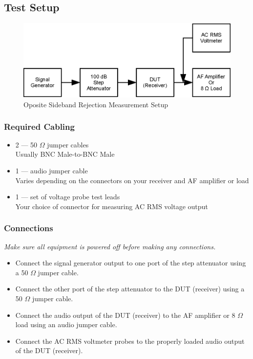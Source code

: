 \documentclass[10pt,letterpaper]{book}
\begin{document}
\subsection*{Test Setup}
\begin{figure}
\centering
\includegraphics[scale=1]{Illustrations/MDSSetup}
\caption{Oposite Sideband Rejection Measurement Setup}
\end{figure}
\subsubsection*{Required Cabling}
\begin{itemize}
	\item 2 --- 50 $\Omega$ jumper cables \\
		Usually BNC Male-to-BNC Male
	\item 1 --- audio jumper cable \\
		Varies depending on the connectors on your receiver and AF amplifier or load
	\item 1 --- set of voltage probe test leads \\
		Your choice of connector for measuring AC RMS voltage output
\end{itemize}
\subsubsection*{Connections}
\emph{Make sure all equipment is powered off before making any connections.}
\begin{itemize}
	\item Connect the signal generator output to one port of the step attenuator using a 50 $\Omega$ jumper cable.
	\item Connect the other port of the step attenuator to the DUT (receiver) using a 50 $\Omega$ jumper cable.
	\item Connect the audio output of the DUT (receiver) to the AF amplifier or 8 $\Omega$ load using an audio jumper cable.
	\item Connect the AC RMS voltmeter probes to the properly loaded audio output of the DUT (receiver).
\end{itemize}
\end{document}
